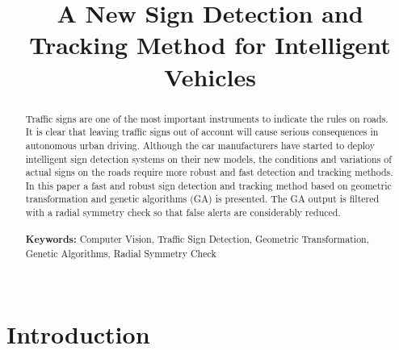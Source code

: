\documentclass[twocolumn,letterpaper,10pt]{article}
\begin{document}
\title{A New Sign Detection and Tracking Method for Intelligent Vehicles}


\maketitle
\thispagestyle{empty}


\begin{abstract}
Traffic signs are one of the most important instruments to indicate the rules on roads. It is clear that leaving traffic signs out of account will cause serious consequences in autonomous urban driving. Although the car manufacturers have started to deploy intelligent sign detection systems on their new models, the conditions and variations of actual signs on the roads require more robust and fast detection and tracking methods. In this paper a fast and robust sign detection and tracking method based on geometric transformation and genetic algorithms (GA) is presented. The GA output is filtered with a radial symmetry check so that false alerts are considerably reduced.  %
\\~\\{\bf Keywords:} Computer Vision, Traffic Sign Detection, Geometric Transformation, Genetic Algorithms, Radial Symmetry Check\\~
\end{abstract}

\section{Introduction}
\end{document}

